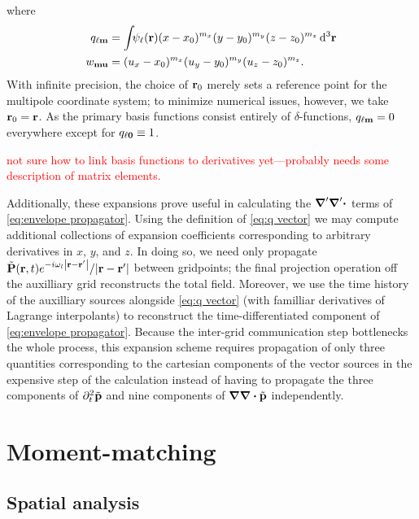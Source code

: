 where
\begin{subequations}
  \begin{align}
    q_{\ell \vb{m}} &= \int_{} \psi_\ell(\vb{r}) (x - x_0)^{m_x} (y - y_0)^{m_y} (z - z_0)^{m_z} \dd[3]{\vb{r}} \label{eq:q vector}\\
    w_{\vb{m}\vb{u}} &= (u_x - x_0)^{m_x} (u_y - y_0)^{m_y} (u_z - z_0)^{m_z} \label{eq:w matrix}.
  \end{align}
\end{subequations}
With infinite precision, the choice of $\vb{r}_0$ merely sets a reference point for the multipole coordinate system; to minimize numerical issues, however, we take $\vb{r}_0 = \vb{r}$.
As the primary basis functions consist entirely of $\delta$-functions, $q_{\ell\vb{m}} = 0$ everywhere except for $q_{\ell \vb{0}} \equiv 1$.

\textcolor{red}{not sure how to link basis functions to derivatives yet---probably needs some description of matrix elements.}

Additionally, these expansions prove useful in calculating the $\grad' \grad' \boldsymbol{\cdot}$ terms of \cref{eq:envelope propagator}.
Using the definition of \cref{eq:q vector} we may compute additional collections of expansion coefficients corresponding to arbitrary derivatives in $x$, $y$, and $z$.
In doing so, we need only propagate $\tilde{\vb{P}}(\vb{r}, t)e^{-i \omega_l \abs{\vb{r} - \vb{r}'}}/\abs{\vb{r} - \vb{r}'}$ between gridpoints; the final projection operation off the auxilliary grid reconstructs the total field.
Moreover, we use the time history of the auxilliary sources alongside \cref{eq:q vector} (with familliar derivatives of Lagrange interpolants) to reconstruct the time-differentiated component of \cref{eq:envelope propagator}.
Because the inter-grid communication step bottlenecks the whole process, this expansion scheme requires propagation of only three quantities corresponding to the cartesian components of the vector sources in the expensive step of the calculation instead of having to propagate the three components of $\partial_t^2 \tilde{\vb{p}}$ and nine components of $\grad \grad \boldsymbol{\cdot} \tilde{\vb{p}}$ independently.

\section{Moment-matching}

\subsection{Spatial analysis}

